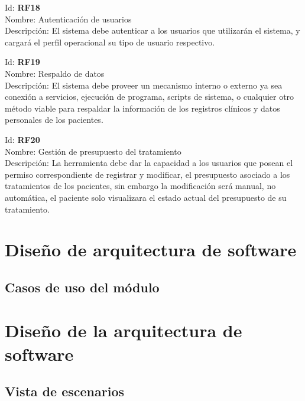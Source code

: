 \vspace{1em}

\noindent Id: \textbf{RF18}\\
Nombre: Autenticación de usuarios\\
Descripción: El sistema debe autenticar a los usuarios que utilizarán el sistema, y cargará el perfil operacional su tipo de usuario respectivo.


\vspace{1em}

\noindent Id: \textbf{RF19}\\
Nombre: Respaldo de datos\\
Descripción: El sistema debe proveer un mecanismo interno o externo ya sea conexión a servicios, ejecución de programa, scripts de sistema, o cualquier otro método viable para respaldar la información de los registros clínicos y datos personales de los pacientes.

\vspace{1em}

\noindent Id: \textbf{RF20}\\
Nombre: Gestión de presupuesto del tratamiento\\
Descripción: La herramienta debe dar la capacidad a los usuarios que posean el permiso correspondiente de registrar y modificar, el presupuesto asociado a los tratamientos de los pacientes, sin embargo la modificación será manual, no automática, el paciente solo visualizara el estado actual del presupuesto de su tratamiento.  

\newpage





\section{Diseño de arquitectura de software}

\subsection{Casos de uso del módulo}








\section{Diseño de la arquitectura de software}


\subsection{Vista de escenarios}


